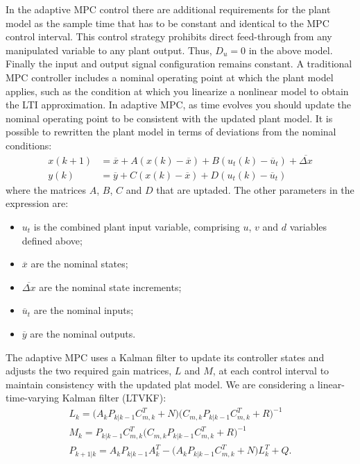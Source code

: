 \documentclass[conference, 11pt]{IEEEtran}
\begin{document}
In the adaptive MPC control there are additional requirements for the plant model as the sample time that has to be constant and identical to the MPC control interval. This control strategy prohibits direct feed-through from any manipulated variable to any plant output. Thus, $D_u = 0$ in the above model. Finally the input and output signal configuration remains constant.
A traditional MPC controller includes a nominal operating point at which the plant model applies, such as the condition at which you linearize a nonlinear model to obtain the LTI
approximation. In adaptive MPC, as time evolves you should update the nominal operating point to be consistent with the updated plant model. It is possible to rewritten the plant model in terms of deviations from the nominal conditions:
\begin{equation*}
\label{eqn:Adaptive_MPC_nominal_condition}
\begin{aligned}
x(k+1)&=\overline{x}+A(x(k)-\overline{x})+ B(u_t(k)-\overline{u}_t)+\overline{\Delta x}\\
y(k)&=\overline{y}+C(x(k)-\overline{x}) + D(u_t(k)-\overline{u}_t)
\end{aligned}
\end{equation*}
where the matrices $A$, $B$, $C$ and $D$ that are uptaded. The other parameters in the expression are:
\begin{itemize}
	\item $u_t$ is the combined plant input variable, comprising $u$, $v$ and $d$ variables defined above;
	\item $\overline{x}$ are the nominal states;
	\item $\overline{\Delta x}$ are the nominal state increments;
	\item $\overline{u}_t$ are the nominal inputs;
	\item $\overline{y}$ are the nominal outputs.
\end{itemize} 
The adaptive MPC uses a Kalman filter to update its controller states and adjusts the two required gain matrices, $L$ and $M$, at each control interval to maintain consistency with the updated plat model. We are considering a linear-time-varying Kalman filter (LTVKF):
\begin{equation*}
\label{eqn:LTVKF}
\begin{array}{lll}
L_k=\big(A_kP_{k|k-1}C_{m,k}^{T}+N\big)\big(C_{m,k}P_{k|k-1}C_{m,k}^{T}+R\big)^{-1}\\
M_k =P_{k|k-1}C_{m,k}^{T}\big(C_{m,k}P_{k|k-1}C_{m,k}^{T}+R\big)^{-1}\\
P_{k+1|k}=A_kP_{k|k-1}A_k^{T}-\big(A_kP_{k|k-1}C_{m,k}^{T}+N\big)L_k^{T}+Q.
\end{array}
\end{equation*}
\end{document}
